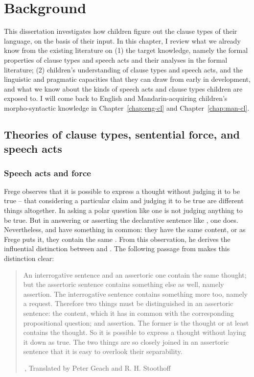 \chapter{Background}
\label{chap:background}

This dissertation investigates how children figure out the clause types of their language, on the basis of their input. In this chapter, I review what we already know from the existing literature on (1) the target knowledge, namely the formal properties of clause types and speech acts and their analyses in the formal literature; (2) children's understanding of clause types and speech acts, and the linguistic and pragmatic capacities that they can draw from early in development, and what we know about the kinds of speech acts and clause types children are exposed to. I will come back to English and Mandarin-acquiring children's morpho-syntactic knowledge in Chapter~\ref{chap:eng-cl} and Chapter~\ref{chap:man-cl}.

\section{Theories of clause types, sentential force, and speech acts} \label{sec:bg:theory}


\subsection{Speech acts and force} \label{sec:bg:theory:speech}

Frege observes that it is possible to express a thought without judging it to be true -- that considering a particular claim and judging it to be true are different things altogether. In asking a polar question like  one is not judging anything to be true. But in answering or asserting the declarative sentence like , one does. Nevertheless,  and  have something in common: they have the same content, or as Frege puts it, they contain the same . From this observation, he derives the influential distinction between  and . The following passage from  makes this distinction clear:

\begin{quote}
    

An interrogative sentence and an assertoric one contain the same thought; but the assertoric sentence contains something else as well, namely assertion. The interrogative sentence contains something more too, namely a request. Therefore two things must be distinguished in an assertoric sentence: the content, which it has in common with the corresponding propositional question; and assertion. The former is the thought or at least contains the thought. So it is possible to express a thought without laying it down as true. The two things are so closely joined in an assertoric sentence that it is easy to overlook their separability. 

$\,$\hfill \cite[62]{frege1918thought}, Translated by Peter Geach and R. H. Stoothoff
\end{quote}

